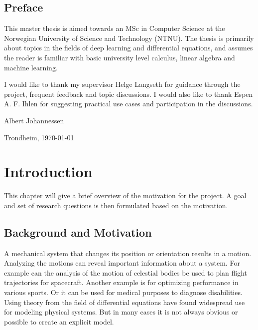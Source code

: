 \documentclass[12pt,a4paper]{book}
\newcommand{\thesisAuthor}{Albert Johannessen}
\begin{document}
\clearpage

\section*{Preface}

\vspace{1cm}

This master thesis is aimed towards an MSc in Computer Science at the Norwegian University of Science and Technology (NTNU). The thesis is primarily about topics in the fields of deep learning and differential equations, and assumes the reader is familiar with basic university level calculus, linear algebra and machine learning.

I would like to thank my supervisor Helge Langseth for guidance through the project, frequent feedback and topic discussions. I would also like to thank Espen A. F. Ihlen for suggesting practical use cases and participation in the discussions.

\vfill

\hfill \thesisAuthor

\hfill Trondheim, \today

\clearpage

\tableofcontents

\listoffigures

\listoftables

\mainmatter

\chapter{Introduction}
\label{cha:Introduction}

This chapter will give a brief overview of the motivation for the project. A goal and set of research questions is then formulated based on the motivation.


\section{Background and Motivation}
\label{sec:BackgroundAndMotivation}

A mechanical system that changes its position or orientation results in a motion. Analyzing the motions can reveal important information about a system. For example can the analysis of the motion of celestial bodies be used to plan flight trajectories for spacecraft. Another example is for optimizing performance in various sports. Or it can be used for medical purposes to diagnose disabilities. Using theory from the field of differential equations have found widespread use for modeling physical systems. But in many cases it is not always obvious or possible to create an explicit model.
\end{document}
